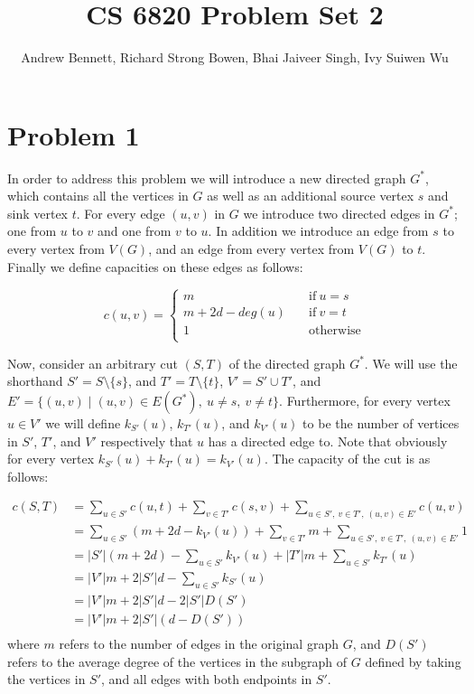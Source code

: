 \documentclass{article}
\author{Andrew Bennett, Richard Strong Bowen, Bhai Jaiveer Singh, Ivy Suiwen Wu}
\title{CS 6820 Problem Set 2}
\begin{document}
\maketitle

\section*{Problem 1}

In order to address this problem we will introduce a new directed graph $G^*$,
which contains all the vertices in $G$ as well as an additional source vertex $s$
and sink vertex $t$. For every edge $(u, v)$ in $G$ we introduce two directed
edges in $G^*$; one from $u$ to $v$ and one from $v$ to $u$. In addition we
introduce an edge from $s$ to every vertex from $V(G)$, and an edge from every
vertex from $V(G)$ to $t$. Finally we define capacities on these edges
as follows:

\[
c(u, v) =
    \begin{cases}
        m &\quad \text{if}\ u = s \\
        m + 2d - deg(u) &\quad \text{if}\ v = t \\
        1 &\quad \text{otherwise} \\
    \end{cases}
\]

Now, consider an arbitrary cut $(S, T)$ of the directed graph $G^*$. We will use the shorthand
$S' = S \setminus \{s\}$, and $T' = T \setminus \{t\}$, $V' = S' \cup T'$, and
$E' = \{(u, v) \mid (u, v) \in E(G^*),\ u \neq s,\ v \neq t\}$.
Furthermore, for every vertex $u \in V'$ we will define $k_{S'}(u)$, $k_{T'}(u)$, and $k_{V'}(u)$
to be the number of vertices in $S'$, $T'$, and $V'$ respectively that $u$ has a directed
edge to. Note that obviously for every vertex $k_{S'}(u) + k_{T'}(u) = k_{V'}(u)$.
The capacity of the cut is as follows:

\begin{align*}
  c(S, T) &= \sum_{u \in S'}{c(u, t)} + \sum_{v \in T'}{c(s, v)} + \sum_{u \in S',\ v \in T',\ (u, v) \in E'}{c(u, v)} \\
          &= \sum_{u \in S'}{(m + 2d - k_{V'}(u))} + \sum_{v \in T'}{m} + \sum_{u \in S',\ v \in T',\ (u, v) \in E'}{1} \\
          &= |S'|(m + 2d) - \sum_{u \in S'}{k_{V'}(u)} + |T'|m + \sum_{u \in S'}{k_{T'}(u)} \\
          &= |V'|m + 2|S'|d - \sum_{u \in S'}{k_{S'}(u)} \\
          &= |V'|m + 2|S'|d - 2|S'|D(S') \\ 
          &= |V'|m + 2|S'|(d - D(S')) \\ 
\end{align*}
where $m$ refers to the number of edges in the original graph $G$, and
$D(S')$ refers to the average degree of the vertices in the subgraph of $G$
defined by taking the vertices in $S'$, and all edges with both endpoints in $S'$.
\end{document}
